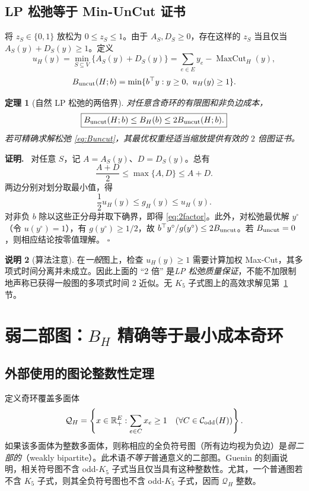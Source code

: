 \documentclass[11pt,a4paper]{ctexart}
\newtheorem{theorem}{定理}[section]
\theoremstyle{definition}
\newtheorem{remark}[theorem]{说明}
\newenvironment{proofcn}{\par\noindent\textbf{证明.}\ }{\hfill$\square$\par}
\newcommand{\Odd}{\mathcal C_{\rm odd}}
\newcommand{\RR}{\mathbb R}
\newcommand{\1}{\boldsymbol 1}
\begin{document}
\subsection{LP 松弛等于 Min-UnCut 证书}
将 $z_S\in\{0,1\}$ 放松为 $0\le z_S\le1$。由于 $A_S,D_S\ge0$，存在这样的 $z_S$ 当且仅当 $A_S(y)+D_S(y)\ge1$。定义
\begin{equation}\label{eq:uncut}
 u_H(y)=\min_{S\subseteq V}\{A_S(y)+D_S(y)\}
 =\sum_{e\in E}y_e-\operatorname{MaxCut}_H(y),
\end{equation}
\begin{equation}\label{eq:Buncut}
 B_{\rm uncut}(H;b)=\min\{b^\top y:y\ge0,\ u_H(y)\ge1\}.
\end{equation}
\begin{theorem}[自然 LP 松弛的两倍界]\label{thm:two}
对任意含奇环的有限图和非负边成本，
\begin{equation}\label{eq:2factor}
 \boxed{B_{\rm uncut}(H;b)\le B_H(b)\le2B_{\rm uncut}(H;b).}
\end{equation}
若可精确求解松弛 \eqref{eq:Buncut}，其最优权重经适当缩放提供有效的 $2$ 倍图证书。
\end{theorem}
\begin{proofcn}
对任意 $S$，记 $A=A_S(y)$、$D=D_S(y)$。总有
\[
 \frac{A+D}{2}\le\max\{A,D\}\le A+D.
\]
两边分别对划分取最小值，得
\begin{equation}\label{eq:ug}
 \frac12 u_H(y)\le g_H(y)\le u_H(y).
\end{equation}
对非负 $b$ 除以这些正分母并取下确界，即得 \eqref{eq:2factor}。此外，对松弛最优解 $y^\circ$（令 $u(y^\circ)=1$），有 $g(y^\circ)\ge1/2$，故 $b^\top y^\circ/g(y^\circ)\le2B_{\rm uncut}$。若 $B_{\rm uncut}=0$，则相应结论按零值理解。
\end{proofcn}

\begin{remark}[算法注意]
在\emph{一般}图上，检查 $u_H(y)\ge1$ 需要计算加权 Max-Cut，其多项式时间分离并未成立。因此上面的 ``2 倍'' 是\emph{LP 松弛质量保证}，不能不加限制地声称已获得一般图的多项式时间 2 近似。无 $K_5$ 子式图上的高效求解见第~\ref{sec:weak} 节。
\end{remark}

\section{弱二部图：$B_H$ 精确等于最小成本奇环}\label{sec:weak}
\subsection{外部使用的图论整数性定理}
定义奇环覆盖多面体
\begin{equation}\label{eq:coverpoly}
 \mathcal Q_H=\left\{x\in\RR_+^{E}:\sum_{e\in C}x_e\ge1
 \quad(\forall C\in\Odd(H))\right\}.
\end{equation}
如果该多面体为整数多面体，则称相应的全负符号图（所有边均视为负边）是\emph{弱二部的}（weakly bipartite）。此术语\emph{不等于}普通意义的二部图。Guenin 的刻画说明，相关符号图不含 odd-$K_5$ 子式当且仅当具有这种整数性\cite{Guenin2001,Schrijver2002}。尤其，一个普通图若不含 $K_5$ 子式，则其全负符号图也不含 odd-$K_5$ 子式，因而 $\mathcal Q_H$ 整数。
\end{document}
